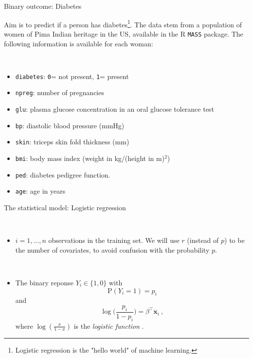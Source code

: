 \documentclass[10pt,ignorenonframetext,]{beamer}
\providecommand{\tightlist}{%
  \setlength{\itemsep}{0pt}\setlength{\parskip}{0pt}}
\begin{document}
\begin{frame}[fragile]

\begin{block}{Binary outcome: Diabetes}

\vspace{2mm}

Aim is to predict if a person has
diabetes\footnote{Logistic regression is the "hello world" of machine learning.}.
The data stem from a population of women of Pima Indian heritage in the
US, available in the R \texttt{MASS} package. The following information
is available for each woman:

\(~\)

\begin{itemize}
\tightlist
\item
  \texttt{diabetes}: \texttt{0}= not present, \texttt{1}= present
\item
  \texttt{npreg}: number of pregnancies
\item
  \texttt{glu}: plasma glucose concentration in an oral glucose
  tolerance test
\item
  \texttt{bp}: diastolic blood pressure (mmHg)
\item
  \texttt{skin}: triceps skin fold thickness (mm)
\item
  \texttt{bmi}: body mass index (weight in kg/(height in m)\(^2\))
\item
  \texttt{ped}: diabetes pedigree function.
\item
  \texttt{age}: age in years
\end{itemize}

\end{block}

\end{frame}

\begin{frame}

\begin{block}{The statistical model: Logistic regression}

\(~\)

\begin{itemize}
\tightlist
\item
  \(i=1,\ldots, n\) observations in the training set. We will use \(r\)
  (instead of \(p\)) to be the number of covariates, to avoid confusion
  with the probability \(p\).
\end{itemize}

\(~\)

\begin{itemize}
\tightlist
\item
  The binary reponse \(Y_i \in \{1, 0\}\) with
  \[\text{P}(Y_i =1 ) = p_i\] and
  \[\log \Big ( \frac{p_i}{1-p_i}\Big ) = \beta^\top {\boldsymbol x}_i \ ,\]
  where \(\log(\frac{x}{1-x})\) is the \emph{logistic function} .
\end{itemize}

\end{block}

\end{frame}
\end{document}
